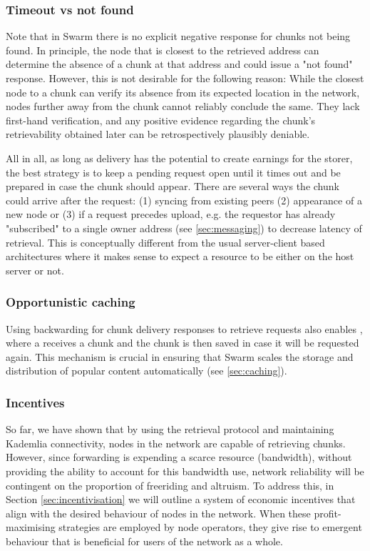 \subsubsection{Timeout vs not found}

Note that in Swarm there is no explicit negative response for chunks not being found. In principle, the node that is closest to the retrieved address can determine the absence of a chunk at that address and could issue a "not found" response. However, this is not desirable for the following reason: While the closest node to a chunk can verify its absence from its expected location in the network, nodes further away from the chunk cannot reliably conclude the same. They lack first-hand verification, and any positive evidence regarding the chunk's retrievability obtained later can be retrospectively plausibly deniable. 

All in all, as long as delivery has the potential to create earnings for the storer, the best strategy is to keep a pending request open until it times out and be prepared in case the chunk should appear. There are several ways the chunk could arrive after the request: (1) syncing from existing peers (2) appearance of a new node or (3) if a request precedes upload, e.g. the requestor has already "subscribed" to a single owner address (see \ref{sec:messaging}) to decrease latency of retrieval. This is conceptually different from the usual server-client based architectures where it makes sense to expect a resource to be either on the host server or not. 
 

\subsubsection{Opportunistic caching}

Using backwarding for chunk delivery responses to retrieve requests also enables , where a  receives a chunk and the chunk is then saved in case it will be requested again. This mechanism is crucial in ensuring that Swarm scales the storage and distribution of popular content automatically (see \ref{sec:caching}).

\subsubsection{Incentives}

So far, we have shown that by using the retrieval protocol and maintaining Kademlia connectivity, nodes in the network are capable of retrieving chunks. However, since forwarding is expending a scarce resource (bandwidth), without providing the ability to account for this bandwidth use, network reliability will be contingent on the proportion of freeriding and altruism. To address this, in Section \ref{sec:incentivisation} we will outline a system of economic incentives that align with the desired behaviour of nodes in the network. When these profit-maximising strategies are employed by node operators, they give rise to emergent behaviour that is beneficial for users of the network as a whole.
 
